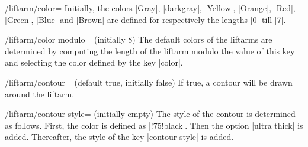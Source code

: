 \documentclass[a4paper,english,dvipsnames]{ltxdoc}
\begin{document}
\begin{command}{\liftarm{}}
\begin{key}{/liftarm/color=}
Initially, the colors |Gray|, |darkgray|, |Yellow|, |Orange|, |Red|, |Green|, |Blue| and |Brown| are defined for respectively the lengths |0| till |7|.
\end{key}
\begin{key}{/liftarm/color modulo= (initially 8)}
The default colors of the liftarms are determined by computing the length of the liftarm modulo the value of this key and selecting the color defined by the key |color|.
\begin{codeexample}[width=10cm]
\end{codeexample}
\end{key}
\begin{key}{/liftarm/contour= (default true, initially false)}
If true, a contour will be drawn around the liftarm.
\begin{codeexample}[width=10cm]
\end{codeexample}
\end{key}
\begin{stylekey}{/liftarm/contour style= (initially \normalfont empty)}
The style of the contour is determined as follows. First, the color is defined as |!75!black|. Then the option |ultra thick| is added. Thereafter, the style of the key |contour style| is added.


\end{stylekey}
\end{command}
\end{document}
